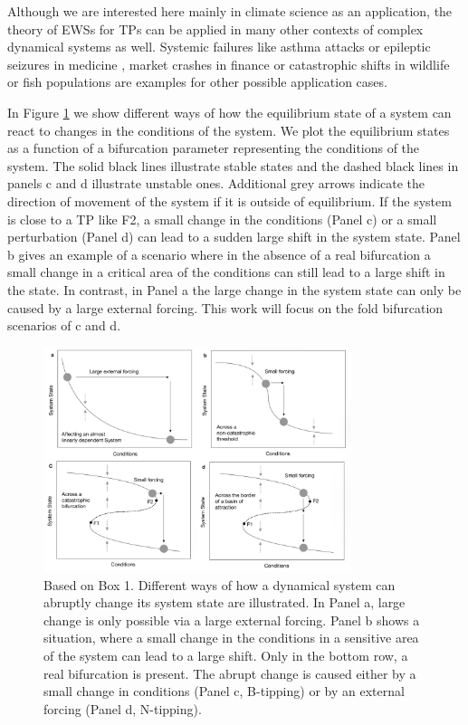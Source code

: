 \documentclass[%
thesis=student,%
coverpage=false,%
titlepage=false,%
headmarks=true, %
english,%
font=libertine, %
math=newpxtx, %
BCOR=5mm,%
coverBCOR=11mm%
]{tumbook}
\begin{document}
Although we are interested here mainly in climate science as an application, the theory of EWSs for TPs can be applied in many other contexts of complex dynamical systems as well. Systemic failures like asthma attacks \cite{Venegas:2005} or epileptic seizures in medicine \cite{Litt:2001, McSharry:2003}, market crashes in finance \cite{Kambhu:2007,May:2008} or catastrophic shifts in wildlife or fish populations \cite{Scheffer:2001, MillenniumEcosystemAssessment:2005} are examples for other possible application cases. 

In Figure \ref{fig:Critical transitions in the fold catastrophe mode} we show different ways of how the equilibrium state of a system can react to changes in the conditions of the system. We plot the equilibrium states as a function of a bifurcation parameter representing the conditions of the system. The solid black lines illustrate stable states and the dashed black lines in panels c and d illustrate unstable ones. Additional grey arrows indicate the direction of movement of the system if it is outside of equilibrium. If the system is close to a TP like F2, a small change in the conditions (Panel c) or a small perturbation (Panel d) can lead to a sudden large shift in the system state. Panel b gives an example of a scenario where in the absence of a real bifurcation a small change in a critical area of the conditions can still lead to a large shift in the state. In contrast, in Panel a the large change in the system state can only be caused by a large external forcing. This work will focus on the fold bifurcation scenarios of c and d.



\begin{figure}[t]
    \centering
    \includegraphics[width=0.8\textwidth]{bachelor-thesis/figures/scheffer_box_1.jpg}
    \caption{Based on \cite{Scheffer:2009} Box 1. Different ways of how a dynamical system can abruptly change its system state are illustrated. In Panel a, large change is only possible via a large external forcing. Panel b shows a situation, where a small change in the conditions in a sensitive area of the system can lead to a large shift. Only in the bottom row, a real bifurcation is present. The abrupt change is caused either by a small change in conditions (Panel c, B-tipping) or by an external forcing (Panel d, N-tipping).}
    \label{fig:Critical transitions in the fold catastrophe mode}
\end{figure}
\end{document}
